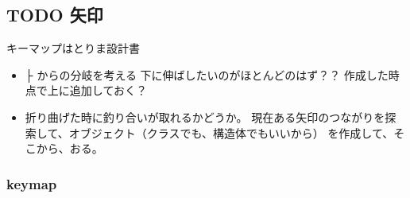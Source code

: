 \documentclass[11pt]{article}
\begin{document}
\subsection{{\bfseries\sffamily TODO} 矢印}
\label{sec:org761d77f}
キーマップはとりま設計書
\begin{itemize}
\item ├ からの分岐を考える
下に伸ばしたいのがほとんどのはず？？
作成した時点で上に追加しておく？
\item 折り曲げた時に釣り合いが取れるかどうか。
現在ある矢印のつながりを探索して、オブジェクト（クラスでも、構造体でもいいから）
を作成して、そこから、おる。
\end{itemize}

\subsubsection{keymap}
\label{sec:org7a0d2f8}
\end{document}
